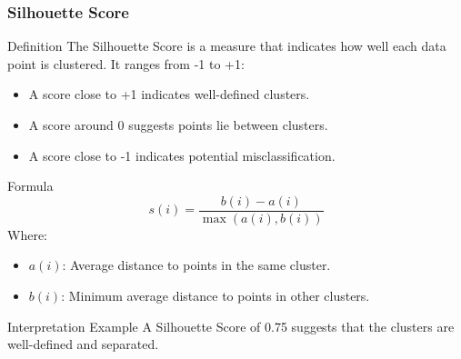 \documentclass{beamer}
\begin{document}
\begin{frame}[fragile]
    \frametitle{Silhouette Score}
    \begin{block}{Definition}
        The Silhouette Score is a measure that indicates how well each data point is clustered. It ranges from -1 to +1:
        \begin{itemize}
            \item A score close to +1 indicates well-defined clusters.
            \item A score around 0 suggests points lie between clusters.
            \item A score close to -1 indicates potential misclassification.
        \end{itemize}
    \end{block}
    
    \begin{block}{Formula}
        \begin{equation}
        s(i) = \frac{b(i) - a(i)}{\max(a(i), b(i))}
        \end{equation}
        Where:
        \begin{itemize}
            \item \( a(i) \): Average distance to points in the same cluster.
            \item \( b(i) \): Minimum average distance to points in other clusters.
        \end{itemize}
    \end{block}
    
    \begin{block}{Interpretation Example}
        A Silhouette Score of 0.75 suggests that the clusters are well-defined and separated.
    \end{block}
\end{frame}
\end{document}
